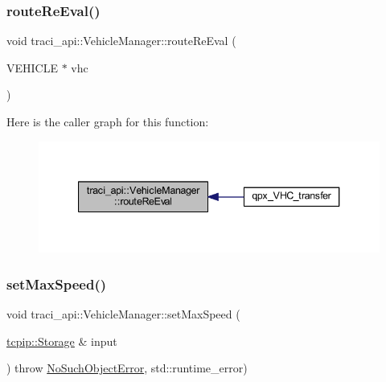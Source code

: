 \subsubsection{\texorpdfstring{route\+Re\+Eval()}{routeReEval()}}
{\footnotesize\ttfamily void traci\+\_\+api\+::\+Vehicle\+Manager\+::route\+Re\+Eval (\begin{DoxyParamCaption}\item[{V\+E\+H\+I\+C\+LE $\ast$}]{vhc }\end{DoxyParamCaption})}

Here is the caller graph for this function\+:
\nopagebreak
\begin{figure}[H]
\begin{center}
\leavevmode
\includegraphics[width=340pt]{classtraci__api_1_1_vehicle_manager_a02bcdc3429c0b027345148d9f5824554_icgraph}
\end{center}
\end{figure}
\mbox{\label{classtraci__api_1_1_vehicle_manager_a5bd46032db2b057eb7e5a5c61d043827}} 
\subsubsection{\texorpdfstring{set\+Max\+Speed()}{setMaxSpeed()}}
{\footnotesize\ttfamily void traci\+\_\+api\+::\+Vehicle\+Manager\+::set\+Max\+Speed (\begin{DoxyParamCaption}\item[{\hyperlink{classtcpip_1_1_storage}{tcpip\+::\+Storage} \&}]{input }\end{DoxyParamCaption}) throw  \hyperlink{classtraci__api_1_1_no_such_object_error}{No\+Such\+Object\+Error}, std\+::runtime\+\_\+error) }

